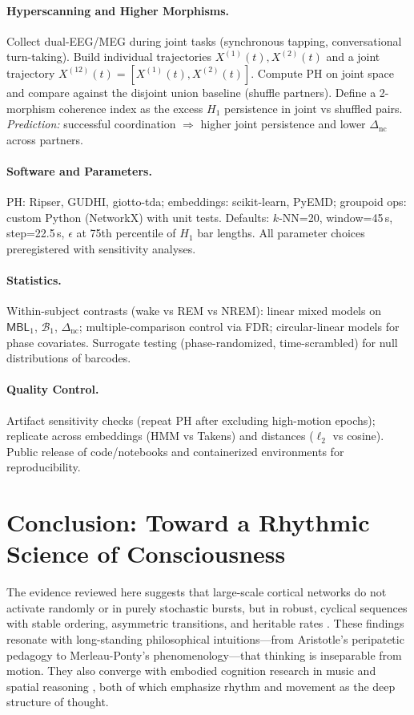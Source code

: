 \documentclass{article}
\begin{document}
\paragraph{Hyperscanning and Higher Morphisms.}
Collect dual-EEG/MEG during joint tasks (synchronous tapping, conversational turn-taking). Build individual trajectories $X^{(1)}(t), X^{(2)}(t)$ and a joint trajectory $X^{(12)}(t){=}[X^{(1)}(t),X^{(2)}(t)]$. Compute PH on joint space and compare against the disjoint union baseline (shuffle partners). Define a 2-morphism coherence index as the excess $H_1$ persistence in joint vs shuffled pairs. \emph{Prediction:} successful coordination $\Rightarrow$ higher joint persistence and lower $\Delta_{\mathrm{nc}}$ across partners.

\paragraph{Software and Parameters.}
PH: Ripser, GUDHI, giotto-tda; embeddings: scikit-learn, PyEMD; groupoid ops: custom Python (NetworkX) with unit tests. Defaults: $k$-NN=20, window=45\,s, step=22.5\,s, $\epsilon$ at 75th percentile of $H_1$ bar lengths. All parameter choices preregistered with sensitivity analyses.

\paragraph{Statistics.}
Within-subject contrasts (wake vs REM vs NREM): linear mixed models on $\mathsf{MBL}_1$, $\mathcal{B}_1$, $\Delta_{\mathrm{nc}}$; multiple-comparison control via FDR; circular-linear models for phase covariates. Surrogate testing (phase-randomized, time-scrambled) for null distributions of barcodes.

\paragraph{Quality Control.}
Artifact sensitivity checks (repeat PH after excluding high-motion epochs); replicate across embeddings (HMM vs Takens) and distances ($\ell_2$ vs cosine). Public release of code/notebooks and containerized environments for reproducibility.


\section{Conclusion: Toward a Rhythmic Science of Consciousness}

The evidence reviewed here suggests that large-scale cortical networks do not activate randomly or in purely stochastic bursts, but in robust, cyclical sequences with stable ordering, asymmetric transitions, and heritable rates \citep{van2025cortical}. These findings resonate with long-standing philosophical intuitions—from Aristotle’s peripatetic pedagogy to Merleau-Ponty’s phenomenology—that thinking is inseparable from motion. They also converge with embodied cognition research in music \citep{cox2016music} and spatial reasoning \citep{tversky2019mind}, both of which emphasize rhythm and movement as the deep structure of thought.
\end{document}
